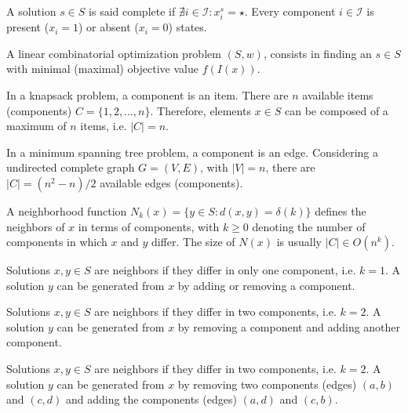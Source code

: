\documentclass[12pt]{llncs}
\begin{document}
\begin{definition}
A solution $s\in S$ is said complete if $\nexists i\in \mathcal{I} : x^{s}_i = \star$. Every component $i\in \mathcal{I}$ is {present} ($x_i=1$) or {absent} ($x_i=0$) states. 
\end{definition}



\begin{definition}
A linear combinatorial optimization problem $(S,w)$, consists in finding an $s\in S$ with minimal (maximal) objective value $f(I(x))$. 
\end{definition}




\begin{tcolorbox}
	\begin{example}
	In a knapsack problem, a component is an item. There are $n$ available items (components) $C=\{1,2,\dots,n\}$. Therefore, elements $x\in S$ can be composed of a maximum of $n$ items, i.e. $|C| = n$. 
	\end{example}
	
	\begin{example}
	In a minimum spanning tree problem, a component is an edge. Considering a undirected complete graph $G=(V,E)$, with $|V|=n$, there are $|C| = {(n^2 - n)}/{2}$ available edges (components). 
	\end{example}
\end{tcolorbox}

\begin{definition}[Neighborhood]
A neighborhood function $N_{k}(x) = \{y\in S : d(x,y) = \delta(k)\}$ defines the neighbors of $x$ in terms of components, with $k\geq 0$ denoting the number of components in which $x$ and $y$ differ. The size of $N(x)$ is usually $|C|\in O(n^k)$.
\end{definition}

\begin{tcolorbox}
	\begin{example}
	Solutions $x,y\in S$ are neighbors if they differ in only one component, i.e. $k = 1$. A solution $y$ can be generated from $x$ by adding or removing a component.
	\end{example}
	
	\begin{example}
	Solutions $x,y\in S$ are neighbors if they differ in two components, i.e. $k = 2$. A solution $y$ can be generated from $x$ by removing a component and adding another component. 
	\end{example}
	
	\begin{example}
	Solutions $x,y\in S$ are neighbors if they differ in two components, i.e. $k = 2$. A solution $y$ can be generated from $x$ by removing two components (edges) $(a,b)$ and $(c,d)$ and adding the components (edges) $(a,d)$ and $(c,b)$.
	\end{example}
\end{tcolorbox}
\end{document}
